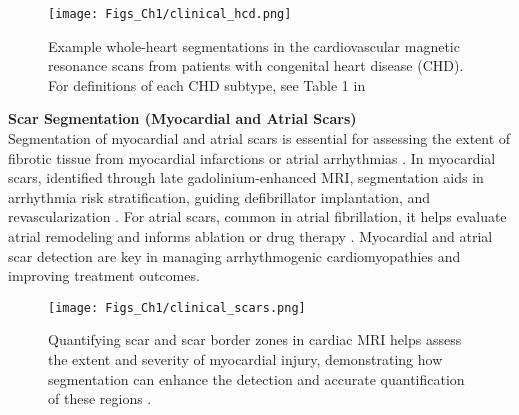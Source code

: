 \begin{figure}[t!]
\centering
\texttt{[image: Figs\_Ch1/clinical\_hcd.png]}
\caption{Example whole-heart segmentations in the cardiovascular magnetic resonance scans from patients with congenital heart disease (CHD). For definitions of each CHD subtype, see Table 1 in \cite{pace2024hvsmr}}
\label{fig1_9}
\end{figure}


\noindent \textbf{Scar Segmentation (Myocardial and Atrial Scars)}\\
Segmentation of myocardial and atrial scars is essential for assessing the extent of fibrotic tissue from myocardial infarctions \cite{karamitsos2020myocardial} or atrial arrhythmias \cite{li2022medical}. In myocardial scars, identified through late gadolinium-enhanced MRI, segmentation aids in arrhythmia risk stratification, guiding defibrillator implantation, and revascularization \cite{zaidi2023machine}. For atrial scars, common in atrial fibrillation, it helps evaluate atrial remodeling and informs ablation or drug therapy \cite{badger2010evaluation}. Myocardial and atrial scar detection are key in managing arrhythmogenic cardiomyopathies and improving treatment outcomes.\\

\begin{figure}[t!]
\centering
\texttt{[image: Figs\_Ch1/clinical\_scars.png]}
\caption{Quantifying scar and scar border zones in cardiac MRI helps assess the extent and severity of myocardial injury, demonstrating how segmentation can enhance the detection and accurate quantification of these regions \cite{sonoda2017scar}.}
\label{fig1_10}
\end{figure}




